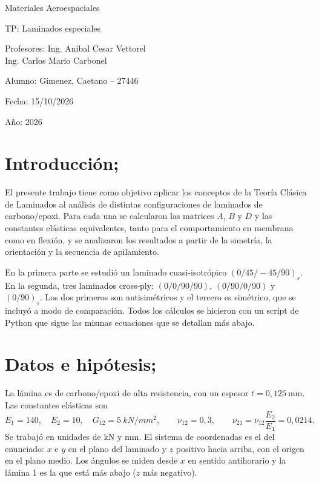 \documentclass[11pt,a4paper]{article}
\newcommand{\Eeq}{\si{kN/mm^2}}
\begin{document}
\begin{titlepage}
\centering
\vspace*{3cm}
{\Huge Materiales Aeroespaciales\par}
\vspace{0.6cm}
{\LARGE TP: Laminados especiales\par}
\vspace{2cm}
{\large Profesores: Ing. Anibal Cesar Vettorel\\
\hspace{2.2cm}Ing. Carlos Mario Carbonel\par}
\vspace{1cm}
{\large Alumno: Gimenez, Caetano -- 27446\par}
\vspace{1cm}
{\large Fecha: 15/10/2026\par}
{\large Año: 2026\par}
\end{titlepage}


\section{Introducción;}

El presente trabajo tiene como objetivo aplicar los conceptos de la Teoría Clásica de Laminados al análisis de distintas configuraciones de laminados de carbono/epoxi. Para cada una se calcularon las matrices $A$, $B$ y $D$ y las constantes elásticas equivalentes, tanto para el comportamiento en membrana como en flexión, y se analizaron los resultados a partir de la simetría, la orientación y la secuencia de apilamiento.

En la primera parte se estudió un laminado cuasi-isotrópico $(0/45/-45/90)_s$. En la segunda, tres laminados cross-ply: $(0/0/90/90)$, $(0/90/0/90)$ y $(0/90)_s$. Los dos primeros son antisimétricos y el tercero es simétrico, que se incluyó a modo de comparación. Todos los cálculos se hicieron con un script de Python que sigue las mismas ecuaciones que se detallan más abajo.

\section{Datos e hipótesis;}

La lámina es de carbono/epoxi de alta resistencia, con un espesor $t=0{,}125\ \mathrm{mm}$. Las constantes elásticas son
\[
E_1=140,\quad E_2=10,\quad G_{12}=5\ \Eeq,\qquad \nu_{12}=0{,}3,
\qquad \nu_{21}=\nu_{12}\frac{E_2}{E_1}=0{,}0214 .
\]
Se trabajó en unidades de kN y mm. El sistema de coordenadas es el del enunciado: $x$ e $y$ en el plano del laminado y $z$ positivo hacia arriba, con el origen en el plano medio. Los ángulos se miden desde $x$ en sentido antihorario y la lámina 1 es la que está más abajo ($z$ más negativo).
\end{document}
